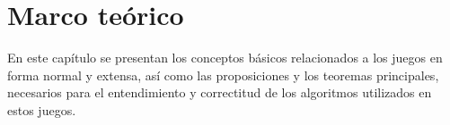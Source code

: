 \chapter{Marco teórico}

En este capítulo se presentan los conceptos básicos relacionados a los juegos en forma normal y extensa, así como las proposiciones y los teoremas principales, necesarios para el entendimiento y correctitud de los algoritmos utilizados en estos juegos.



